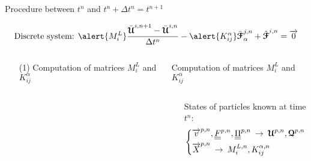 \begin{frame}{Procedure between $t^n$ and $t^n + \Delta t^n=t^{n+1}$}
  \begin{footnotesize}
    \begin{equation*}
      \text{Discrete system: }\alert{M^L_{i}} \frac{\bar{\Ucb}^{i,n+1} - \bar{\Ucb}^{i,n}}{\Delta t^n}  - \alert{K_{ij}^\alpha} \bar{\Fcb}^{j,n}_{\alpha}  + \hat{\Fcb}^{i,n}=  \vect{0}
    \end{equation*}
    \begin{columns}
      \begin{column}{0.4\textwidth}
        \begin{itemize}
        \item[(1)] Computation of matrices $M_i^L$ and $K_{ij}^\alpha$
        \end{itemize}
      \end{column}
      \vrule{}
      \begin{column}{0.6\textwidth}
        \begin{block}{Computation of matrices $M_i^L$ and $K_{ij}^\alpha$}
          \begin{columns}
            \begin{column}{0.3\textwidth}
              \vskip 0.9pt
            \end{column}
            \begin{column}{0.6\textwidth}
              States of particles known at time $t^n$:
              \begin{equation*}
                \left\lbrace\begin{aligned}
                    & {\overrightarrow{v}}^{p,n},{\underline{\underline{F}}}^{p,n},{\underline{\underline{\Pi}}}^{p,n} \: \rightarrow \:{\boldsymbol{\mathcal{U}}}^{p,n},{\boldsymbol{\mathcal{Q}}}^{p,n}\\
                    & {\overrightarrow{X}}^{p,n} \: \rightarrow \:M_i^{L,n},K_{ij}^{\alpha,n}
                  \end{aligned}\right.
              \end{equation*}
              
            \end{column}
          \end{columns}
        \end{block}
      \end{column}
    \end{columns}
  \end{footnotesize}
\end{frame}

